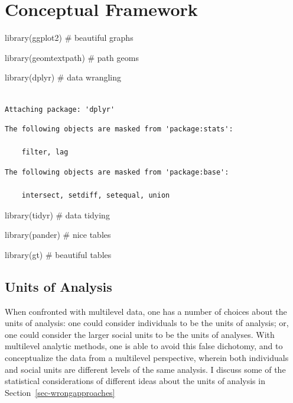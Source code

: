 \documentclass[
  letterpaper,
  DIV=11,
  numbers=noendperiod]{scrreprt}
\newenvironment{Shaded}{\begin{snugshade}}{\end{snugshade}}
\newcommand{\CommentTok}[1]{\textcolor[rgb]{0.37,0.37,0.37}{#1}}
\newcommand{\FunctionTok}[1]{\textcolor[rgb]{0.28,0.35,0.67}{#1}}
\newcommand{\NormalTok}[1]{\textcolor[rgb]{0.00,0.23,0.31}{#1}}
\begin{document}
\hypertarget{conceptual-framework}{%
\chapter{Conceptual Framework}\label{conceptual-framework}}

\begin{Shaded}
\begin{Highlighting}[]
\FunctionTok{library}\NormalTok{(ggplot2) }\CommentTok{\# beautiful graphs}

\FunctionTok{library}\NormalTok{(geomtextpath) }\CommentTok{\# path geoms}

\FunctionTok{library}\NormalTok{(dplyr) }\CommentTok{\# data wrangling}
\end{Highlighting}
\end{Shaded}

\begin{verbatim}

Attaching package: 'dplyr'
\end{verbatim}

\begin{verbatim}
The following objects are masked from 'package:stats':

    filter, lag
\end{verbatim}

\begin{verbatim}
The following objects are masked from 'package:base':

    intersect, setdiff, setequal, union
\end{verbatim}

\begin{Shaded}
\begin{Highlighting}[]
\FunctionTok{library}\NormalTok{(tidyr) }\CommentTok{\# data tidying}

\FunctionTok{library}\NormalTok{(pander) }\CommentTok{\# nice tables}

\FunctionTok{library}\NormalTok{(gt) }\CommentTok{\# beautiful tables}
\end{Highlighting}
\end{Shaded}

\hypertarget{units-of-analysis}{%
\section{Units of Analysis}\label{units-of-analysis}}

When confronted with multilevel data, one has a number of choices about
the units of analysis: one could consider individuals to be the units of
analysis; or, one could consider the larger social units to be the units
of analyses. With multilevel analytic methods, one is able to avoid this
false dichotomy, and to conceptualize the data from a multilevel
perspective, wherein both individuals and social units are different
levels of the same analysis. I discuss some of the statistical
considerations of different ideas about the units of analysis in
Section~\ref{sec-wrongapproaches}
\end{document}
